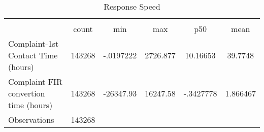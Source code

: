 \begin{table}[htbp]\centering
\def\sym#1{\ifmmode^{#1}\else\(^{#1}\)\fi}
\caption{Response Speed}
\begin{tabular}{l*{1}{ccccc}}
\hline\hline
                    &\multicolumn{5}{c}{}                                            \\
                    &       count&         min&         max&         p50&        mean\\
\hline
Complaint-1st Contact Time (hours)&      143268&   -.0197222&    2726.877&    10.16653&     39.7748\\
Complaint-FIR convertion time (hours)&      143268&   -26347.93&    16247.58&   -.3427778&    1.866467\\
\hline
Observations        &      143268&            &            &            &            \\
\hline\hline
\end{tabular}
\end{table}
